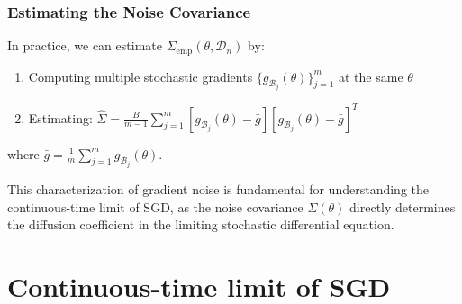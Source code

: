 \documentclass[11pt]{article}
\begin{document}
\subsubsection{Estimating the Noise Covariance}

In practice, we can estimate $\Sigma_{\text{emp}}(\theta, \mathcal{D}_n)$ by:
\begin{enumerate}
    \item Computing multiple stochastic gradients $\{g_{\mathcal{B}_j}(\theta)\}_{j=1}^m$ at the same $\theta$
    \item Estimating: $\hat{\Sigma} = \frac{B}{m-1} \sum_{j=1}^m [g_{\mathcal{B}_j}(\theta) - \bar{g}][g_{\mathcal{B}_j}(\theta) - \bar{g}]^T$
\end{enumerate}

where $\bar{g} = \frac{1}{m} \sum_{j=1}^m g_{\mathcal{B}_j}(\theta)$.

This characterization of gradient noise is fundamental for understanding the continuous-time limit of SGD, as the noise covariance $\Sigma(\theta)$ directly determines the diffusion coefficient in the limiting stochastic differential equation.

\section{Continuous-time limit of SGD}
\end{document}
